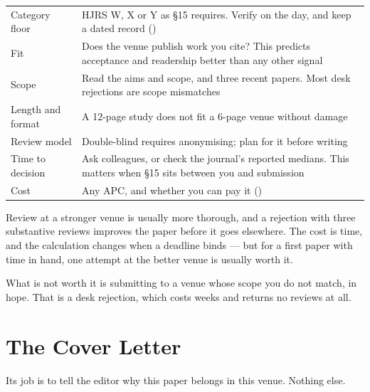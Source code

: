 \begin{center}
\small
\begin{tabular}{@{}L{3.4cm}L{10.9cm}@{}}
\toprule
Category floor   & HJRS W, X or Y as \S15 requires. Verify on the day, and keep
                   a dated record () \\
Fit              & Does the venue publish work you cite? This predicts
                   acceptance and readership better than any other signal \\
Scope            & Read the aims and scope, and three recent papers. Most desk
                   rejections are scope mismatches \\
Length and format& A 12-page study does not fit a 6-page venue without damage \\
Review model     & Double-blind requires anonymising; plan for it before
                   writing \\
Time to decision & Ask colleagues, or check the journal's reported medians.
                   This matters when \S15 sits between you and submission \\
Cost             & Any APC, and whether you can pay it () \\
\bottomrule
\end{tabular}
\end{center}

\begin{conceptbox}
Review at a stronger venue is usually more thorough, and a rejection with three
substantive reviews improves the paper before it goes elsewhere. The cost is
time, and the calculation changes when a deadline binds --- but for a first
paper with time in hand, one attempt at the better venue is usually worth it.

\medskip
What is not worth it is submitting to a venue whose scope you do not match, in
hope. That is a desk rejection, which costs weeks and returns no reviews at
all.
\end{conceptbox}

\section{The Cover Letter}

Its job is to tell the editor why this paper belongs in this venue. Nothing
else.


